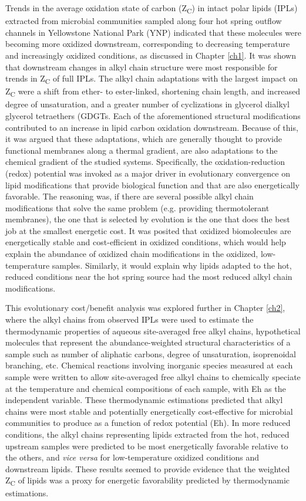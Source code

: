 Trends in the average oxidation state of carbon (Z\textsubscript{C}) in intact polar lipids (IPLs) extracted from microbial communities sampled along four hot spring outflow channels in Yellowstone National Park (YNP) indicated that these molecules were becoming more oxidized downstream, corresponding to decreasing temperature and increasingly oxidized conditions, as discussed in Chapter \ref{ch1}. It was shown that downstream changes in alkyl chain structure were most responsible for trends in Z\textsubscript{C} of full IPLs. The alkyl chain adaptations with the largest impact on Z\textsubscript{C} were a shift from ether- to ester-linked, shortening chain length, and increased degree of unsaturation, and a greater number of cyclizations in glycerol dialkyl glycerol tetraethers (GDGTs. Each of the aforementioned structural modifications contributed to an increase in lipid carbon oxidation downstream. Because of this, it was argued that these adaptations, which are generally thought to provide functional membranes along a thermal gradient, are also adaptations to the chemical gradient of the studied systems. Specifically, the oxidation-reduction (redox) potential was invoked as a major driver in evolutionary convergence on lipid modifications that provide biological function and that are also energetically favorable. The reasoning was, if there are several possible alkyl chain modifications that solve the same problem (e.g. providing thermotolerant membranes), the one that is selected by evolution is the one that does the best job at the smallest energetic cost. It was posited that oxidized biomolecules are energetically stable and cost-efficient in oxidized conditions, which would help explain the abundance of oxidized chain modifications in the oxidized, low-temperature samples. Similarly, it would explain why lipids adapted to the hot, reduced conditions near the hot spring source had the most reduced alkyl chain modifications.

This evolutionary cost/benefit analysis was explored further in Chapter \ref{ch2}, where the alkyl chains from observed IPLs were used to estimate the thermodynamic properties of aqueous site-averaged free alkyl chains, hypothetical molecules that represent the abundance-weighted structural characteristics of a sample such as number of aliphatic carbons, degree of unsaturation, isoprenoidal branching, etc. Chemical reactions involving inorganic species measured at each sample were written to allow site-averaged free alkyl chains to chemically speciate at the temperature and chemical compositions of each sample, with Eh as the independent variable. These thermodynamic estimations predicted that alkyl chains were most stable and potentially energetically cost-effective for microbial communities to produce as a function of redox potential (Eh). In more reduced conditions, the alkyl chains representing lipids extracted from the hot, reduced upstream samples were predicted to be most energetically favorable relative to the others, and \textit{vice versa} for low-temperature oxidized conditions and downstream lipids. These results seemed to provide evidence that the weighted Z\textsubscript{C} of lipids was a proxy for energetic favorability predicted by thermodynamic estimations.


